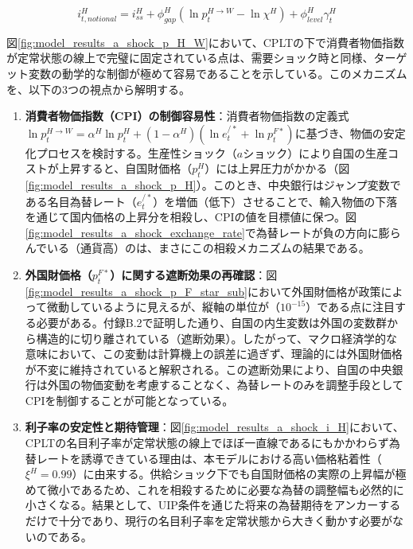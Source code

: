 \begin{equation}
i_{t,notional}^H=i_{ss}^H+\phi_{gap}^H(\ln p_t^{H\to W}-\ln\chi^H)+\phi_{level}^H\gamma_t^H
\label{form:model_results_a_shock_cplt_rule}
\end{equation}

図\ref{fig:model_results_a_shock_p_H_W}において、CPLTの下で消費者物価指数が定常状態の線上で完璧に固定されている点は、需要ショック時と同様、ターゲット変数の動学的な制御が極めて容易であることを示している。このメカニズムを、以下の3つの視点から解明する。

\begin{enumerate}
    \item\label{itm:model_results_a_shock_asad_analysis_cplt_easiness} \textbf{消費者物価指数（CPI）の制御容易性}：消費者物価指数の定義式\(\ln p_t^{H\to W}=\alpha^H\ln p_t^H+(1-\alpha^H)(\ln e_t^{/*}+\ln p_t^{F*})\)に基づき、物価の安定化プロセスを検討する。生産性ショック（\(a\)ショック）により自国の生産コストが上昇すると、自国財価格（\(p_t^H\)）には上昇圧力がかかる（図\ref{fig:model_results_a_shock_p_H}）。このとき、中央銀行はジャンプ変数である名目為替レート（\(e_t^{/*}\)）を増価（低下）させることで、輸入物価の下落を通じて国内価格の上昇分を相殺し、CPIの値を目標値に保つ。図\ref{fig:model_results_a_shock_exchange_rate}で為替レートが負の方向に膨らんでいる（通貨高）のは、まさにこの相殺メカニズムの結果である。
    \item\label{itm:model_results_a_shock_asad_analysis_cplt_insulation} \textbf{外国財価格（\(p_t^{F*}\)）に関する遮断効果の再確認}：図\ref{fig:model_results_a_shock_p_F_star_sub}において外国財価格が政策によって微動しているように見えるが、縦軸の単位が（\(10^{-15}\)）である点に注目する必要がある。付録B.2で証明した通り、自国の内生変数は外国の変数群から構造的に切り離されている（遮断効果）。したがって、マクロ経済学的な意味において、この変動は計算機上の誤差に過ぎず、理論的には外国財価格が不変に維持されていると解釈される。この遮断効果により、自国の中央銀行は外国の物価変動を考慮することなく、為替レートのみを調整手段としてCPIを制御することが可能となっている。
    \item\label{itm:model_results_a_shock_asad_analysis_cplt_interest} \textbf{利子率の安定性と期待管理}：図\ref{fig:model_results_a_shock_i_H}において、CPLTの名目利子率が定常状態の線上でほぼ一直線であるにもかかわらず為替レートを誘導できている理由は、本モデルにおける高い価格粘着性（\(\xi^H=0.99\)）に由来する。供給ショック下でも自国財価格の実際の上昇幅が極めて微小であるため、これを相殺するために必要な為替の調整幅も必然的に小さくなる。結果として、UIP条件を通じた将来の為替期待をアンカーするだけで十分であり、現行の名目利子率を定常状態から大きく動かす必要がないのである。
\end{enumerate}


